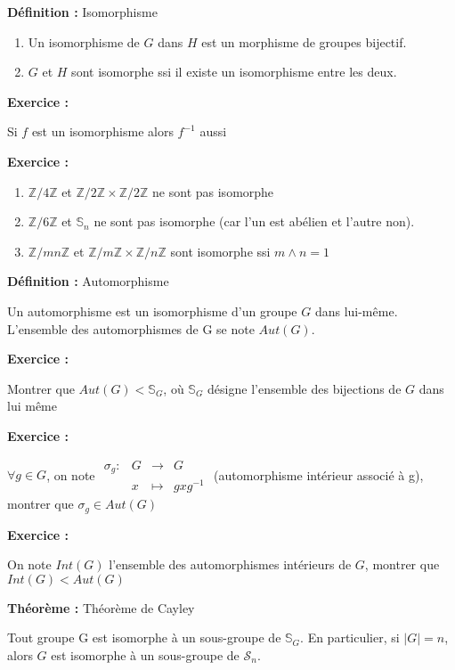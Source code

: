 \documentclass{report}
\newenvironment{definition}[1][]{
    \begin{tcolorbox}[colframe= white]
    \textbf{Définition :} 
    #1 \par
    }
    {\end{tcolorbox}}
\newenvironment{exo}{\begin{tcolorbox}[colframe= white]
    \textbf{Exercice :}
    \par}
    {\end{tcolorbox}}
\newenvironment{theoreme}[1][]{
    \begin{tcolorbox}[]
    \textbf{Théorème :} #1  \par} 
    {\end{tcolorbox}}
\newcommand{\fonction}[5]{
    \begin{array}{l|rcl}
    #1: & #2 & \longrightarrow & #3 \\
        & #4 & \longmapsto & #5 
    \end{array}
}
\newcommand{\Z}{\mathbb{Z}}
\newcommand{\znz}{\Z/n\Z}
\newcommand{\sn}{\mathcal{S}_{n}}
\begin{document}
\begin{definition}[Isomorphisme]
\begin{enumerate}
    \item Un isomorphisme de $G$ dans $H$ est un morphisme de groupes bijectif.
    \item $G$ et $H$ sont isomorphe ssi il existe un isomorphisme entre les deux.
\end{enumerate}
\end{definition}

\begin{exo}
    Si $f$ est un isomorphisme alors $f^{-1}$ aussi
\end{exo}

\begin{exo}
\begin{enumerate}
    \item $\Z /4\Z$ et $\Z/2\Z \times \Z/2\Z$ ne sont pas isomorphe
    \item $\Z/6\Z$ et $\mathbb{S}_n$ ne sont pas isomorphe (car l'un est abélien et l'autre non).
    \item $\Z/mn\Z$ et $\Z/m\Z \times \znz$ sont isomorphe ssi $m\wedge n = 1$
\end{enumerate}
\end{exo}

\begin{definition}[Automorphisme]
    Un automorphisme est un isomorphisme d'un groupe $G$ dans lui-même. L'ensemble des automorphismes de G se note $Aut(G)$.
\end{definition}

\begin{exo}
    Montrer que $Aut(G) < \mathbb{S}_G$, où $\mathbb{S}_{G}$ désigne l'ensemble des bijections de $G$ dans lui même
\end{exo}

\begin{exo}
    $\forall g\in G$, on note $\fonction{\sigma_g}{G}{G}{x}{gxg^{-1}}$ (automorphisme intérieur associé à g), montrer que $\sigma_g \in Aut(G)$
\end{exo}

\begin{exo}
    On note $Int(G)$ l'ensemble des automorphismes intérieurs de $G$, montrer que $Int(G) < Aut(G)$
\end{exo}

\begin{theoreme}[Théorème de Cayley]
    Tout groupe G est isomorphe à un sous-groupe de $\mathbb{S}_G$. En particulier, si $|G| = n$, alors $G$ est isomorphe à un sous-groupe de $\sn$.
\end{theoreme}
\end{document}
